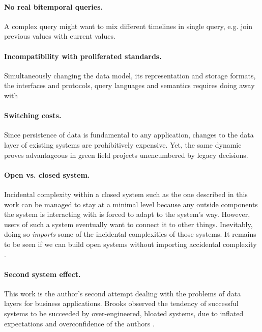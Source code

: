 \paragraph{No real bitemporal queries.} A complex query might want to mix different timelines in single query, e.g. join previous values with current values.

\paragraph{Incompatibility with proliferated standards.} Simultaneously changing the data model, its representation and storage formats, the interfaces and protocols, query languages and semantics requires doing away with

\paragraph{Switching costs.} Since persistence of data is fundamental to any application, changes to the data layer of existing systems are prohibitively expensive. Yet, the same dynamic proves advantageous in green field projects unencumbered by legacy decisions.

\paragraph{Open vs. closed system.} Incidental complexity within a closed system such as the one described in this work can be managed to stay at a minimal level because any outside components the system is interacting with is forced to adapt to the system's way. However, users of such a system eventually want to connect it to other things. Inevitably, doing so \emph{imports} some of the incidental complexities of those systems. It remains to be seen if we can build open systems without importing accidental complexity \cite{moffat16eve}.

\paragraph{Second system effect.} This work is the author's second attempt dealing with the problems of data layers for business applications. Brooks observed the tendency of successful systems to be succeeded by over-engineered, bloated systems, due to inflated expectations and overconfidence of the authors \cite{brooks1995mythical}.
